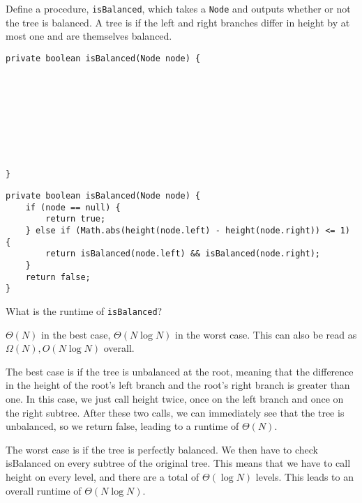 \question Define a procedure, \texttt{isBalanced}, which takes a \texttt{Node} and outputs whether or not the tree is balanced. A tree is  if the left and right branches differ in height by at most one and are themselves balanced.

\ifprintanswers
\else
\begin{lstlisting}
private boolean isBalanced(Node node) {









}
\end{lstlisting}
\fi

\begin{solution}
\begin{lstlisting}
private boolean isBalanced(Node node) {
    if (node == null) {
        return true;
    } else if (Math.abs(height(node.left) - height(node.right)) <= 1) {
        return isBalanced(node.left) && isBalanced(node.right);
    }
    return false;
}
\end{lstlisting}
\end{solution}

What is the runtime of \texttt{isBalanced}?
\begin{solution}[0.25in]
$\Theta(N)$ in the best case, $\Theta(N \log N)$ in the worst case.  This can also be read as $\Omega(N), O(N \log N)$ overall.

The best case is if the tree is unbalanced at the root, meaning that the difference in the height of the root's left branch and the root's right branch is greater than one.  In this case, we just call height twice, once on the left branch and once on the right subtree.  After these two calls, we can immediately see that the tree is unbalanced, so we return false, leading to a runtime of $\Theta(N)$.

The worst case is if the tree is perfectly balanced.  We then have to check isBalanced on every subtree of the original tree.  This means that we have to call height on every level, and there are a total of $\Theta(\log N)$ levels.  This leads to an overall runtime of $\Theta(N \log N)$.
\end{solution}